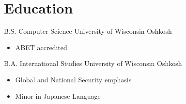 \documentclass[12pt,letterpaper,sans]{moderncv}
\begin{document}
\makecvtitle
\section{Education}
    {B.S. Computer Science}
    {University of Wisconsin Oshkosh}
    {}
    {}
    {\begin{itemize}
        \item ABET accredited
    \end{itemize}}
    {B.A. International Studies} 
    {University of Wisconsin Oshkosh}
    {}
    {} 
    {\begin{itemize}
        \item Global and National Security emphasis
        \item Minor in Japanese Language
    \end{itemize}}
\end{document}

